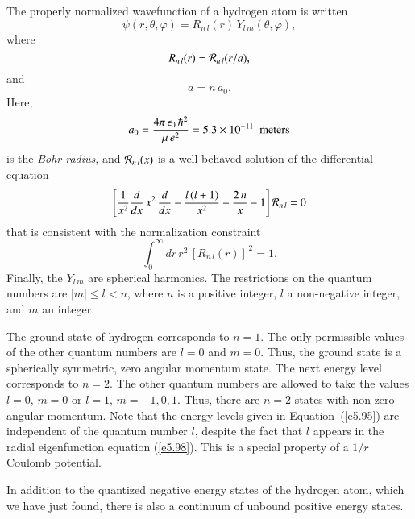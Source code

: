 The properly normalized wavefunction of a hydrogen atom is written
\begin{equation}
\psi(r, \theta, \varphi) = R_{n\,l}(r)\, Y_{l\,m} (\theta, \varphi),
\end{equation}
where
\begin{equation}
R_{n\,l}(r) = {\cal R}_{n\,l}(r/a),
\end{equation}
and
\begin{equation}
a = n\,a_0.
\end{equation}
Here, 
\begin{equation}
a_0 =\frac{4\pi\, \epsilon_0\,\hbar^2}{\mu \,e^2} = 5.3\times 10^{-11}\,\,\,{\rm meters}
\end{equation}
is the {\em Bohr radius}, and 
 ${\cal R}_{n\,l}(x)$ is a well-behaved solution of the differential equation
\begin{equation}\label{e5.98}
\left[\frac{1}{x^2} \frac{d}{dx}\, x^2 \,\frac{d}{dx}-\frac{l\,(l+1)}{x^2}
+ \frac{2\,n}{x} - 1\right] {\cal R}_{n\,l} = 0
\end{equation}
that is consistent with  the normalization constraint
\begin{equation}
\int_0^\infty dr\,r^2\,[R_{n\,l}(r)]^{\,2}= 1.
\end{equation}
Finally, the $Y_{l\,m}$ are spherical harmonics. The restrictions on the quantum numbers
are  $|m| \leq l< n$, where $n$ is a positive integer, $l$ 
a non-negative integer, and $m$ an integer. 

The ground state of hydrogen corresponds to $n=1$. The only permissible values
of the other quantum numbers are $l=0$ and $m=0$. Thus, the ground state is
a spherically symmetric,  zero angular momentum state. The next energy level corresponds to $n=2$. The other quantum numbers are
allowed to take the values $l=0$, $m=0$ or $l=1$, $m=-1, 0, 1$. Thus, there are
$n=2$ states with non-zero angular momentum. Note that the energy levels given
in Equation~(\ref{e5.95}) are independent of the quantum number $l$, despite the fact that
$l$ appears in the radial eigenfunction equation (\ref{e5.98}). This is a special
property of a $1/r$ Coulomb potential. 

In addition to the quantized negative energy states of the
hydrogen atom, which we have just found, there
is  also a continuum of unbound positive energy states. 


